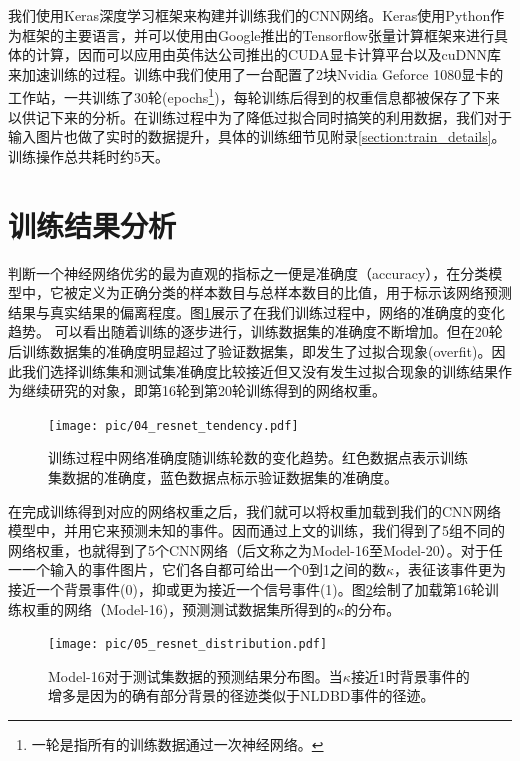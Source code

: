 我们使用Keras\supercite{keras}深度学习框架来构建并训练我们的CNN网络。Keras使用Python作为框架的主要语言，并可以使用由Google推出的Tensorflow\supercite{tensorflow}张量计算框架来进行具体的计算，因而可以应用由英伟达公司推出的CUDA显卡计算平台以及cuDNN\supercite{cudnn}库来加速训练的过程。训练中我们使用了一台配置了2块Nvidia Geforce 1080显卡的工作站，一共训练了30轮(epochs\footnote{一轮是指所有的训练数据通过一次神经网络。})，每轮训练后得到的权重信息都被保存了下来以供记下来的分析。在训练过程中为了降低过拟合同时搞笑的利用数据，我们对于输入图片也做了实时的数据提升，具体的训练细节见附录\ref{section:train_details}。训练操作总共耗时约5天。
  
\section{训练结果分析}
\label{section:cnn_result}

判断一个神经网络优劣的最为直观的指标之一便是准确度（accuracy），在分类模型中，它被定义为正确分类的样本数目与总样本数目的比值，用于标示该网络预测结果与真实结果的偏离程度。图\ref{fig:train_par}展示了在我们训练过程中，网络的准确度的变化趋势。
可以看出随着训练的逐步进行，训练数据集的准确度不断增加。但在20轮后训练数据集的准确度明显超过了验证数据集，即发生了过拟合现象(overfit)。因此我们选择训练集和测试集准确度比较接近但又没有发生过拟合现象的训练结果作为继续研究的对象，即第16轮到第20轮训练得到的网络权重。

\begin{figure}
    \centering
    \texttt{[image: pic/04\_resnet\_tendency.pdf]}
    \caption{训练过程中网络准确度随训练轮数的变化趋势。红色数据点表示训练集数据的准确度，蓝色数据点标示验证数据集的准确度。}
    \label{fig:train_par}
\end{figure}

在完成训练得到对应的网络权重之后，我们就可以将权重加载到我们的CNN网络模型中，并用它来预测未知的事件。因而通过上文的训练，我们得到了5组不同的网络权重，也就得到了5个CNN网络（后文称之为Model-16至Model-20）。对于任一一个输入的事件图片，它们各自都可给出一个0到1之间的数$\kappa$，表征该事件更为接近一个背景事件(0)，抑或更为接近一个信号事件(1)。图\ref{fig:cnn_dis}绘制了加载第16轮训练权重的网络（Model-16)，预测测试数据集所得到的$\kappa$的分布。

\begin{figure}
    \centering
    \texttt{[image: pic/05\_resnet\_distribution.pdf]}
    \caption{Model-16对于测试集数据的预测结果分布图。当$\kappa$接近1时背景事件的增多是因为的确有部分背景的径迹类似于NLDBD事件的径迹。}
    \label{fig:cnn_dis}
\end{figure}

